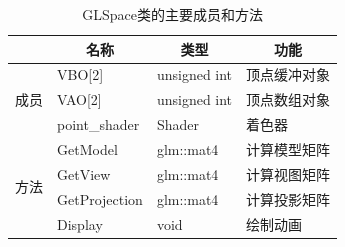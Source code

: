 \begin{table}[htbp]
	\centering
	\caption{GLSpace类的主要成员和方法}
	\label{table:GLSpace}
	\begin{tabular}{|l|m{3cm}|m{4cm}|m{5cm}|}
		\hline
		                    & \multicolumn{1}{c|}{名称}                 & \multicolumn{1}{c|}{类型}                & \multicolumn{1}{c|}{功能}          \\ \hline
		\multirow{3}{*}{成员} & \centering\arraybackslash VBO{[}2{]}    & \centering\arraybackslash unsigned int & \centering\arraybackslash 顶点缓冲对象 \\ \cline{2-4}
		                    & \centering\arraybackslash VAO{[}2{]}    & \centering\arraybackslash unsigned int & \centering\arraybackslash 顶点数组对象 \\ \cline{2-4}
		                    & \centering\arraybackslash point\_shader & \centering\arraybackslash Shader       & \centering\arraybackslash 着色器    \\ \hline
		\multirow{4}{*}{方法} & \centering\arraybackslash GetModel      & \centering\arraybackslash glm::mat4    & \centering\arraybackslash 计算模型矩阵 \\ \cline{2-4}
		                    & \centering\arraybackslash GetView       & \centering\arraybackslash glm::mat4    & \centering\arraybackslash 计算视图矩阵 \\ \cline{2-4}
		                    & \centering\arraybackslash GetProjection & \centering\arraybackslash glm::mat4    & \centering\arraybackslash 计算投影矩阵 \\ \cline{2-4}
		                    & \centering\arraybackslash Display       & \centering\arraybackslash void         & \centering\arraybackslash 绘制动画   \\ \hline
	\end{tabular}
\end{table}

